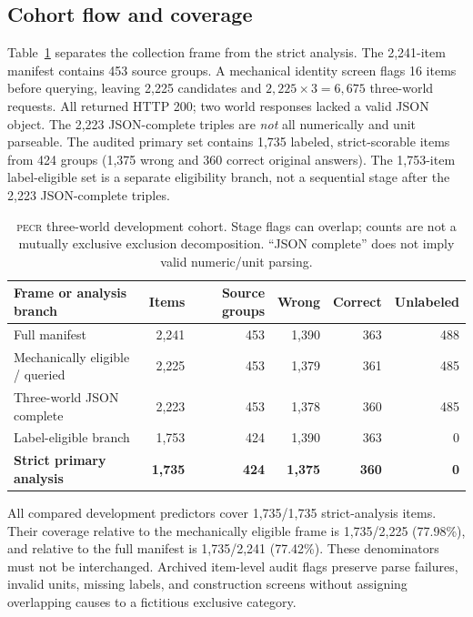 \documentclass[11pt]{article}
\newcommand{\PECR}{\textsc{pecr}}
\begin{document}
\subsection{Cohort flow and coverage}
Table~\ref{tab:cohort} separates the collection frame from the strict analysis. The 2,241-item manifest contains 453 source groups. A mechanical identity screen flags 16 items before querying, leaving 2,225 candidates and $2{,}225\times3=6{,}675$ three-world requests. All returned HTTP 200; two world responses lacked a valid JSON object. The 2,223 JSON-complete triples are \emph{not} all numerically and unit parseable. The audited primary set contains 1,735 labeled, strict-scorable items from 424 groups (1,375 wrong and 360 correct original answers). The 1,753-item label-eligible set is a separate eligibility branch, not a sequential stage after the 2,223 JSON-complete triples.

\begin{table}[t]
\centering
\small
\caption{\PECR{} three-world development cohort. Stage flags can overlap; counts are not a mutually exclusive exclusion decomposition. ``JSON complete'' does not imply valid numeric/unit parsing.}
\label{tab:cohort}
\begin{tabular}{lrrrrr}
\toprule
Frame or analysis branch & Items & Source groups & Wrong & Correct & Unlabeled \\
\midrule
Full manifest & 2,241 & 453 & 1,390 & 363 & 488 \\
Mechanically eligible / queried & 2,225 & 453 & 1,379 & 361 & 485 \\
Three-world JSON complete & 2,223 & 453 & 1,378 & 360 & 485 \\
Label-eligible branch & 1,753 & 424 & 1,390 & 363 & 0 \\
\textbf{Strict primary analysis} & \textbf{1,735} & \textbf{424} & \textbf{1,375} & \textbf{360} & \textbf{0} \\
\bottomrule
\end{tabular}
\end{table}

All compared development predictors cover 1,735/1,735 strict-analysis items. Their coverage relative to the mechanically eligible frame is 1,735/2,225 (77.98\%), and relative to the full manifest is 1,735/2,241 (77.42\%). These denominators must not be interchanged. Archived item-level audit flags preserve parse failures, invalid units, missing labels, and construction screens without assigning overlapping causes to a fictitious exclusive category.
\end{document}
